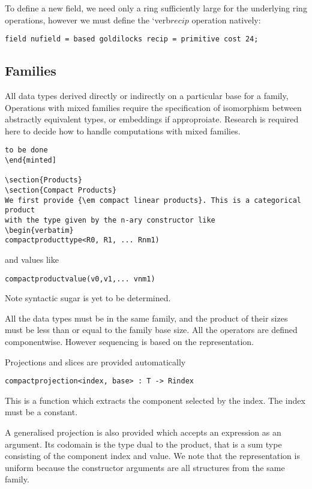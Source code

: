 \documentclass[oneside]{book}
\theoremstyle{plain}
\theoremstyle{definition}
\theoremstyle{plain}
\begin{document}
To define a new field, we need only a ring sufficiently large for the underlying
ring operations, however we must define the `verb$recip$ operation natively:
\begin{verbatim}
field nufield = based goldilocks recip = primitive cost 24;
\end{verbatim}

\subsection{Families}
All data types derived directly or indirectly on a particular
base for a family, Operations with mixed families require
the specification of isomorphism between abstractly equivalent types,
or embeddings if approproiate. Research is required here to decide
how to handle computations with mixed families.
\begin{verbatim}
to be done
\end{minted]

\section{Products}
\section{Compact Products}
We first provide {\em compact linear products}. This is a categorical product
with the type given by the n-ary constructor like
\begin{verbatim}
compactproducttype<R0, R1, ... Rnm1)
\end{verbatim}
and values like
\begin{verbatim}
compactproductvalue(v0,v1,... vnm1)
\end{verbatim}
Note syntactic sugar is yet to be determined.

All the data types must be in the same family, and the product
of their sizes must be less than or equal to the family base size.
All the operators are defined componentwise. However sequencing
is based on the representation.

Projections and slices are provided automatically
\begin{verbatim}
compactprojection<index, base> : T -> Rindex
\end{verbatim}
This is a function which extracts the component selected
by the index. The index must be a constant.

A generalised projection is also provided which accepts an
expression as an argument. Its codomain is the type dual
to the product, that is a sum type consisting of the component
index and value.  We note that the representation is uniform because
the constructor arguments are all structures from the same family.
\end{document}

